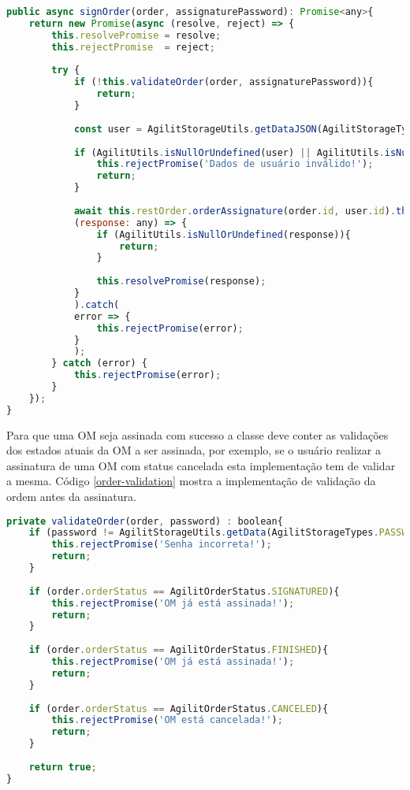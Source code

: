 \begin{lstlisting}[language=JavaScript, caption={Assinar a ordem de manutenção}, label={sign-order-mobile}]
public async signOrder(order, assignaturePassword): Promise<any>{
	return new Promise(async (resolve, reject) => {
		this.resolvePromise = resolve;
		this.rejectPromise  = reject;
		
		try {
			if (!this.validateOrder(order, assignaturePassword)){
				return;
			}        
			
			const user = AgilitStorageUtils.getDataJSON(AgilitStorageTypes.USERDATA);
			
			if (AgilitUtils.isNullOrUndefined(user) || AgilitUtils.isNullOrUndefined(user.id) || user.id == ''){
				this.rejectPromise('Dados de usuário inválido!');
				return;
			}
			
			await this.restOrder.orderAssignature(order.id, user.id).then(
			(response: any) => {
				if (AgilitUtils.isNullOrUndefined(response)){
					return;
				}
				
				this.resolvePromise(response);
			}
			).catch(
			error => {
				this.rejectPromise(error);
			}
			);
		} catch (error) {
			this.rejectPromise(error);
		}
	});
}
\end{lstlisting}

Para que uma OM seja assinada com sucesso a classe deve conter as validações dos estados atuais da OM a ser assinada, por exemplo, se o usuário realizar a assinatura de uma OM com status cancelada esta implementação tem de validar a mesma.
Código \ref{order-validation} mostra a implementação de validação da ordem antes da assinatura.

\begin{lstlisting}[language=JavaScript, caption={Validar estados da OM}, label={order-validation}]
private validateOrder(order, password) : boolean{
	if (password != AgilitStorageUtils.getData(AgilitStorageTypes.PASSWORD)){
		this.rejectPromise('Senha incorreta!');
		return;
	}
	
	if (order.orderStatus == AgilitOrderStatus.SIGNATURED){
		this.rejectPromise('OM já está assinada!');
		return;
	}
	
	if (order.orderStatus == AgilitOrderStatus.FINISHED){
		this.rejectPromise('OM já está assinada!');
		return;
	}
	
	if (order.orderStatus == AgilitOrderStatus.CANCELED){      
		this.rejectPromise('OM está cancelada!');
		return;
	}
	
	return true;
}
\end{lstlisting}

